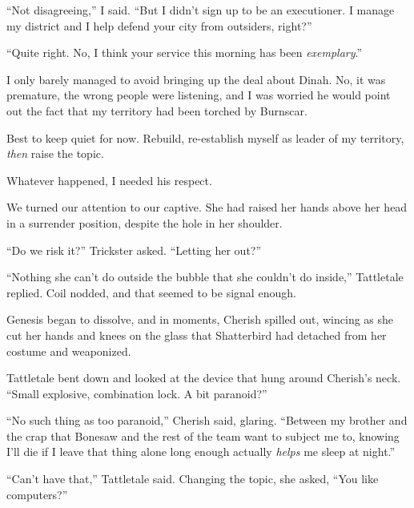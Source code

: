 ``Not disagreeing,'' I said.  ``But I didn't sign up to be an executioner.  I manage my district and I help defend your city from outsiders, right?''



``Quite right.  No, I think your service this morning has been \emph{exemplary}.''



I only barely managed to avoid bringing up the deal about Dinah.  No, it was premature, the wrong people were listening, and I was worried he would point out the fact that my territory had been torched by Burnscar.



Best to keep quiet for now.  Rebuild, re-establish myself as leader of my territory, \emph{then} raise the topic.



Whatever happened, I needed his respect.



We turned our attention to our captive.  She had raised her hands above her head in a surrender position, despite the hole in her shoulder.



``Do we risk it?'' Trickster asked.  ``Letting her out?''



``Nothing she can't do outside the bubble that she couldn't do inside,'' Tattletale replied.  Coil nodded, and that seemed to be signal enough.



Genesis began to dissolve, and in moments, Cherish spilled out, wincing as she cut her hands and knees on the glass that Shatterbird had detached from her costume and weaponized.



Tattletale bent down and looked at the device that hung around Cherish's neck.  ``Small explosive, combination lock.  A bit paranoid?''



``No such thing as too paranoid,'' Cherish said, glaring.  ``Between my brother and the crap that Bonesaw and the rest of the team want to subject me to, knowing I'll die if I leave that thing alone long enough actually \emph{helps} me sleep at night.''



``Can't have that,'' Tattletale said.  Changing the topic, she asked, ``You like computers?''




